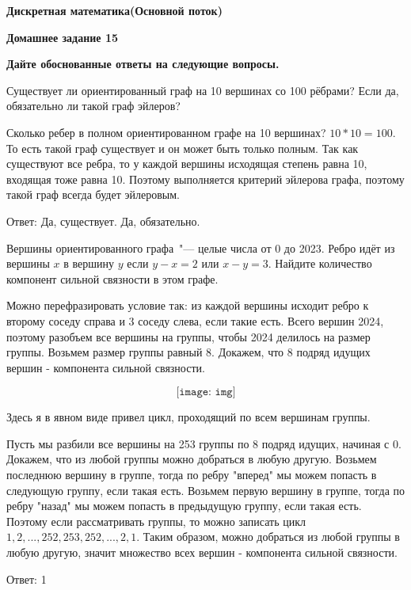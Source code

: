 \documentclass[11pt]{article}
\def\week{15}
\def\theproblem{К\week.\arabic{problem}}
\begin{document}
\setcounter{problem}{0}
\def\theproblem{Д\week.\arabic{problem}}
{\textbf{\large Дискретная математика}\hfill \textbf{(Основной поток)}

\medskip %

\textbf{Домашнее задание \week}}

\medskip

\textbf{Дайте обоснованные ответы на следующие вопросы.}


\vspace{5mm}

\p Существует ли ориентированный граф на 10 вершинах со 100 рёбрами? Если да, обязательно ли такой граф эйлеров?

Сколько ребер в полном ориентированном графе на 10 вершинах? $10 * 10 = 100$. То есть такой граф существует и он может быть только полным.
Так как существуют все ребра, то у каждой вершины исходящая степень равна 10, входящая тоже равна 10. Поэтому выполняется критерий эйлерова графа, поэтому такой граф всегда будет эйлеровым.

Ответ: Да, существует. Да, обязательно.

\p Вершины ориентированного графа~"--- целые числа от 0 до 2023. Ребро
идёт из вершины $x$ в вершину $y$ если $y-x=2$ или $x-y=3$. Найдите
количество компонент сильной связности в этом графе. 

Можно перефразировать условие так: из каждой вершины исходит ребро к второму соседу справа и 3 соседу слева, если такие есть.
Всего вершин 2024, поэтому разобъем все вершины на группы, чтобы 2024 делилось на размер группы. Возьмем размер группы равный 8.
Докажем, что 8 подряд идущих вершин - компонента сильной связности. 

\[\texttt{[image: img]}\]

Здесь я в явном виде привел цикл, проходящий по всем вершинам группы. 

Пусть мы разбили все вершины на 253 группы по 8 подряд идущих, начиная с 0. Докажем, что из любой группы можно добраться в любую другую.
Возьмем последнюю вершину в группе, тогда по ребру "вперед" \space мы можем попасть в следующую группу, если такая есть. 
Возьмем первую вершину в группе, тогда по ребру "назад" \space мы можем попасть в предыдущую группу, если такая есть. 
Поэтому если рассматривать группы, то можно записать цикл $1,2,...,252,253,252,...,2,1$.
Таким образом, можно добраться из любой группы в любую другую, значит множество всех вершин - компонента сильной связности.

Ответ: 1
\end{document}
